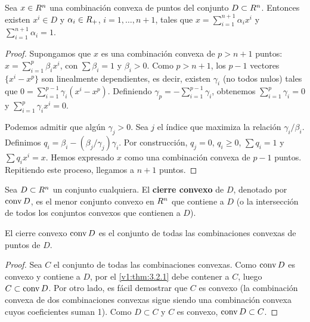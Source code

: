 \begin{theorem}\label{v1:thm:3.2.2}
 Sea $x \in R^n$ una combinación convexa de puntos del conjunto $D \subset R^n$. Entonces existen $x^i \in D$ y $\alpha_i \in R_+$, $i = 1, \dots, n + 1$, tales que $x = \sum_{i=1}^{n+1} \alpha_i x^i$ y $\sum_{i=1}^{n+1} \alpha_i = 1$.
\end{theorem}

\begin{proof}
 Supongamos que $x$ es una combinación convexa de $p > n + 1$ puntos: $x = \sum_{i=1}^p \beta_i x^i$, con $\sum \beta_i = 1$ y $\beta_i > 0$. Como $p > n + 1$, los $p - 1$ vectores $\{x^i - x^p\}$ son linealmente dependientes, es decir, existen $\gamma_i$ (no todos nulos) tales que $0 = \sum_{i=1}^{p-1} \gamma_i (x^i - x^p)$. Definiendo $\gamma_p = -\sum_{i=1}^{p-1} \gamma_i$, obtenemos $\sum_{i=1}^p \gamma_i = 0$ y $\sum_{i=1}^p \gamma_i x^i = 0$.
 
 Podemos admitir que algún $\gamma_j > 0$. Sea $j$ el índice que maximiza la relación $\gamma_i / \beta_i$. Definimos $q_i = \beta_i - (\beta_j / \gamma_j) \gamma_i$. Por construcción, $q_j = 0$, $q_i \ge 0$, $\sum q_i = 1$ y $\sum q_i x^i = x$. Hemos expresado $x$ como una combinación convexa de $p - 1$ puntos. Repitiendo este proceso, llegamos a $n + 1$ puntos.
\end{proof}

\begin{definition}\label{v1:def:3.2.2}
 Sea $D \subset R^n$ un conjunto cualquiera. El \textbf{cierre convexo} de $D$, denotado por $\operatorname{conv} D$, es el menor conjunto convexo en $R^n$ que contiene a $D$ (o la intersección de todos los conjuntos convexos que contienen a $D$).
\end{definition}

\begin{proposition}\label{v1:prop:3.2.4}
 El cierre convexo $\operatorname{conv} D$ es el conjunto de todas las combinaciones convexas de puntos de $D$.
\end{proposition}

\begin{proof}
 Sea $C$ el conjunto de todas las combinaciones convexas. Como $\operatorname{conv} D$ es convexo y contiene a $D$, por el \cref{v1:thm:3.2.1} debe contener a $C$, luego $C \subset \operatorname{conv} D$. Por otro lado, es fácil demostrar que $C$ es convexo (la combinación convexa de dos combinaciones convexas sigue siendo una combinación convexa cuyos coeficientes suman 1). Como $D \subset C$ y $C$ es convexo, $\operatorname{conv} D \subset C$.
\end{proof}

